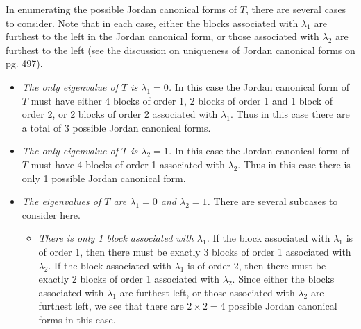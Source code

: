 \documentclass[12pt]{article}
\begin{document}
In enumerating the possible Jordan canonical forms of $T$, there are several cases to consider. Note that in each case, either the blocks associated with $\lambda_1$ are furthest to the left in the Jordan canonical form, or those associated with $\lambda_2$ are furthest to the left (see the discussion on uniqueness of Jordan canonical forms on pg. 497).
\begin{itemize}
\item
{\it The only eigenvalue of $T$ is $\lambda_1 = 0$.} In this case the Jordan canonical form of $T$ must have either 4 blocks of order 1, 2 blocks of order 1 and 1 block of order 2, or 2 blocks of order 2 associated with $\lambda_1$. Thus in this case there are a total of 3 possible Jordan canonical forms.

\item
{\it The only eigenvalue of $T$ is $\lambda_2 = 1$.} In this case the Jordan canonical form of $T$ must have 4 blocks of order 1 associated with $\lambda_2$. Thus in this case there is only 1 possible Jordan canonical form.

\item
{\it The eigenvalues of $T$ are $\lambda_1 = 0$ and $\lambda_2 = 1$.} There are several subcases to consider here.
\begin{itemize}
\item
{\it There is only 1 block associated with $\lambda_1$.} If the block associated with $\lambda_1$ is of order 1, then there must be exactly 3 blocks of order 1 associated with $\lambda_2$. If the block associated with $\lambda_1$ is of order 2, then there must be exactly 2 blocks of order 1 associated with $\lambda_2$. Since either the blocks associated with $\lambda_1$ are furthest left, or those associated with $\lambda_2$ are furthest left, we see that there are $2 \times 2 = 4$ possible Jordan canonical forms in this case.


\end{itemize}
\end{itemize}
\end{document}
